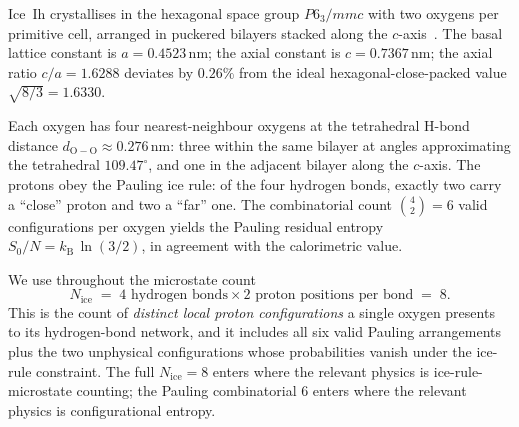 \documentclass[final]{siamltex}
\newcommand{\Nrule}{N_{\mathrm{ice}}}
\newcommand{\kB}{k_{\mathrm{B}}}
\begin{document}
Ice~Ih crystallises in the hexagonal space group $P6_3/mmc$ with
two oxygens per primitive cell, arranged in puckered bilayers
stacked along the $c$-axis~\cite{PetrenkoWhitworth1999}.  The
basal lattice constant is $a = 0.4523$\,nm; the axial constant is
$c = 0.7367$\,nm; the axial ratio $c/a = 1.6288$ deviates by
$0.26\%$ from the ideal hexagonal-close-packed value
$\sqrt{8/3} = 1.6330$.

Each oxygen has four nearest-neighbour oxygens at the tetrahedral
H-bond distance $d_{\mathrm{O\!-\!O}} \approx 0.276$\,nm: three
within the same bilayer at angles approximating the tetrahedral
$109.47^{\circ}$, and one in the adjacent bilayer along the
$c$-axis.  The protons obey the Pauling ice rule: of the four
hydrogen bonds, exactly two carry a ``close'' proton and two a
``far'' one.  The combinatorial count $\binom{4}{2} = 6$ valid
configurations per oxygen yields the Pauling residual entropy
$S_0/N = \kB\,\ln(3/2)$, in agreement with the calorimetric value.

We use throughout the microstate count
\begin{equation}\label{eq:Nrule}
\Nrule \;=\; 4 \text{ hydrogen bonds} \times 2 \text{ proton positions per bond} \;=\; 8.
\end{equation}
This is the count of \emph{distinct local proton configurations}
a single oxygen presents to its hydrogen-bond network, and it
includes all six valid Pauling arrangements plus the two unphysical
configurations whose probabilities vanish under the ice-rule
constraint.  The full $\Nrule = 8$ enters where the relevant
physics is ice-rule-microstate counting; the Pauling combinatorial
$6$ enters where the relevant physics is configurational entropy.
\end{document}
